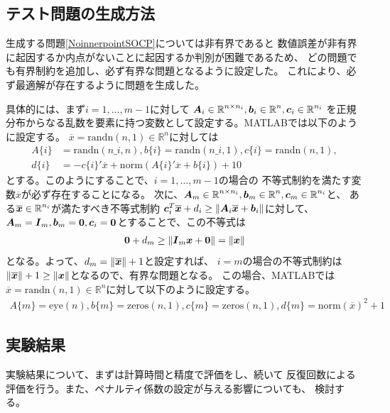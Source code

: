 \documentclass[11pt,a4paper,dvipdfmx,titlepage,uplatex]{jsarticle}
\theoremstyle{mystyle}
\newcommand{\red}[1]{\begin{color}{red}#1\end{color}}
\newcommand{\0}{\mathbf{0}}
\def\0{\mbox{\bf 0}}
\def\b{\mbox{\boldmath $b$}}
\def\c{\mbox{\boldmath $c$}}
\def\x{\mbox{\boldmath $x$}}
\def\A{\mbox{\boldmath $A$}}
\def\I{\mbox{\boldmath $I$}}
\def\Real{\mbox{$\mathbb{R}$}}
\begin{document}
\subsection{テスト問題の生成方法}\label{sec:Problem_Generation}


生成する問題\eqref{NoinnerpointSOCP}については非有界であると
数値誤差が非有界に起因するか内点がないことに起因するか判別が困難であるため、
どの問題でも有界制約を追加し、必ず有界な問題となるように設定した。
これにより、必ず最適解が存在するように問題を生成した。

具体的には、まず$i = 1 , \dots , m-1$に対して
$\A_i \in \Real^{n \times n_i}, \b_i \in \Real^n, \c_i \in \Real^{n_i}$
を正規分布からなる乱数を要素に持つ変数として設定する。MATLABでは以下のように設定する。
$\overline{x} = \text{randn} (n,1) \in \Real^n$に対しては
\begin{align}
  A\{i\} &= \text{randn}(n\_i,n) , b\{i\} = \text{randn}(n\_i,1) ,
  c\{i\} = \text{randn}(n,1) , \\
  d\{i\} &= -c\{i\}' \overline{x} + \text{norm}(A\{i\}' \overline{x}+b\{i\}) + 10
\end{align}
とする。このようにすることで、$i = 1 , \dots , m-1$の場合の
不等式制約を満たす変数$\overline{x}$が必ず存在することになる。
次に、$\A_m \in \Real^{n \times n_i}, \b_m \in \Real^{n}, \c_m \in \Real^{n_i}$と、
ある$\overline{\x} \in \Real^{n_i}$が満たすべき不等式制約
$\c_i^T \overline{\x} + d_i \ge \|\A_i \overline{\x} + \b_i \|$に対して、
$\A_m = \I_m, \b_m = \0, \c_i = \0$とすることで、この不等式は
\begin{align}
	\0 + d_m \ge \|\I_m \x + \0\| = \|\x\|
\end{align}
となる。よって、$d_m = \|\overline{\x}\|+1$と設定すれば、
$i=m$の場合の不等式制約は$\|\overline{\x}\|+1 \ge \|\x\|$となるので、有界な問題となる。
この場合、MATLABでは$\overline{x} = \text{randn} (n,1) \in \Real^n$に対して以下のように設定する。
\begin{align}
  A\{m\} = \text{eye}(n) , b\{m\} = \text{zeros}(n,1) ,
  c\{m\} = \text{zeros}(n,1) ,
  d\{m\} = \text{norm} (\overline{x})^2 + 1
\end{align}

\subsection{実験結果}\label{sec:Numerical_Result}
実験結果について、まずは計算時間と精度で評価をし、続いて
反復回数による評価を行う。また、ペナルティ係数の設定が与える影響についても、
検討する。
\end{document}
